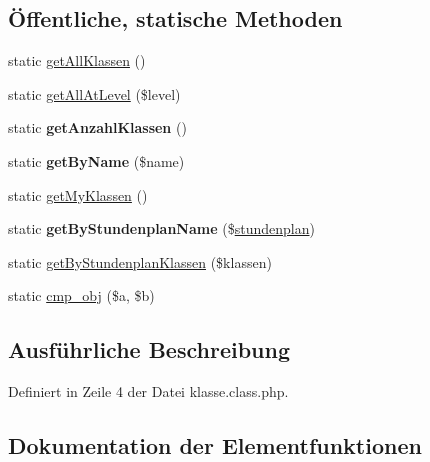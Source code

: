 \subsection*{Öffentliche, statische Methoden}
\begin{DoxyCompactItemize}
\item 
static \mbox{\hyperlink{classklasse_a8fe97d28fb74a0b44bb8c3647dbe2722}{get\+All\+Klassen}} ()
\item 
static \mbox{\hyperlink{classklasse_a74de541e57a14e46c0b45dbbbe0c0420}{get\+All\+At\+Level}} (\$level)
\item 
\mbox{\label{classklasse_ac9fec45be0017c342664bff3f1292d6c}} 
static {\bfseries get\+Anzahl\+Klassen} ()
\item 
\mbox{\label{classklasse_a0e0973bca514c54ca5c6150bb275895f}} 
static {\bfseries get\+By\+Name} (\$name)
\item 
static \mbox{\hyperlink{classklasse_a00cc961e6c8fdaf750d00c2f5ccf75ff}{get\+My\+Klassen}} ()
\item 
\mbox{\label{classklasse_afb32652eb3b306c30f47f93c60b4dceb}} 
static {\bfseries get\+By\+Stundenplan\+Name} (\$\mbox{\hyperlink{classstundenplan}{stundenplan}})
\item 
static \mbox{\hyperlink{classklasse_ab1709bd110448189804340c2b873a825}{get\+By\+Stundenplan\+Klassen}} (\$klassen)
\item 
static \mbox{\hyperlink{classklasse_a02650826bda78199a42524a23c514f09}{cmp\+\_\+obj}} (\$a, \$b)
\end{DoxyCompactItemize}


\subsection{Ausführliche Beschreibung}


Definiert in Zeile 4 der Datei klasse.\+class.\+php.



\subsection{Dokumentation der Elementfunktionen}
\mbox{\label{classklasse_a02650826bda78199a42524a23c514f09}} 
